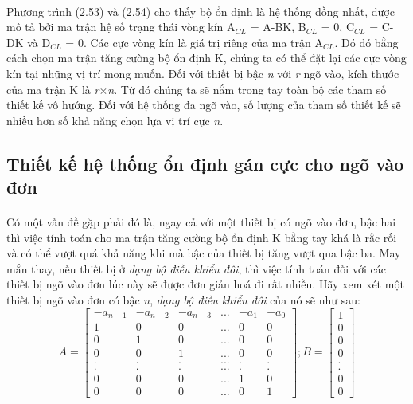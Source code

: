 \paragraph{}Phương trình (2.53) và (2.54) cho thấy bộ ổn định là hệ thống đồng nhất, được mô tả bởi ma trận hệ số trạng thái vòng kín A$_{CL}$ = A-BK, B$_{CL}$ = 0, C$_{CL}$ = C-DK và D$_{CL}$ = 0. Các cực vòng kín là giá trị riêng của ma trận A$_{CL}$. Dó đó bằng cách chọn ma trận tăng cường bộ ổn định K, chúng ta có thể đặt lại các cực vòng kín tại những vị trí mong muốn. Đối với thiết bị bậc \textit{n} với \textit{r} ngõ vào, kích thước của ma trận K là \textit{r}$\times$\textit{n}. Từ đó chúng ta sẽ nắm trong tay toàn bộ các tham số thiết kế vô hướng. Đối với hệ thống đa ngõ vào, số lượng của tham số thiết kế sẽ nhiều hơn số khả năng chọn lựa vị trí cực \textit{n}. 
\subsection{Thiết kế hệ thống ổn định gán cực cho ngõ vào đơn}
\paragraph{}Có một vấn đề gặp phải đó là, ngay cả với một thiết bị có ngõ vào đơn, bậc hai thì việc tính toán cho ma trận tăng cường bộ ổn định K bằng tay khá là rắc rối và có thể vượt quá khả năng khi mà bậc của thiết bị tăng vượt qua bậc ba. May mắn thay, nếu thiết bị ở \textit{dạng bộ điều khiển đôi}, thì việc tính toán đối với các thiết bị ngõ vào đơn lúc này sẽ được đơn giản hoá đi rất nhiều. Hãy xem xét một thiết bị ngõ vào đơn có bậc \textit{n}, \textit{dạng bộ điều khiển đôi} của nó sẽ như sau: 
\begin{equation}
A = 
\begin{bmatrix}
-a_{n-1} & -a_{n-2} & -a_{n-3} & ... & -a_{1} & -a_{0}\\
1 & 0 & 0 & ... & 0 & 0\\
0& 1 & 0 & ... & 0 & 0 \\
0 & 0 & 1 & ... & 0 & 0\\
. & . & . & ... & . & . \\
. & . & . & ... & . & . \\
0 & 0 & 0 & ... & 1 & 0 \\
0 & 0 & 0 & ... & 0 & 1
\end{bmatrix}
;
B = 
\begin{bmatrix}
1\\
0\\
0\\
0\\
.\\
.\\
0\\
0
\end{bmatrix}
\end{equation}
